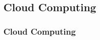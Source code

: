 \subsection{Cloud Computing}

\begin{frame}
  \frametitle{Cloud Computing}
  \begin{minipage}[l]{0.49\linewidth}
    \small{$\;$} \\
    \small{$\;$} \\
  \end{minipage}\hfill
  \begin{minipage}[l]{0.49\linewidth}
  \end{minipage}\hfill
\end{frame}
